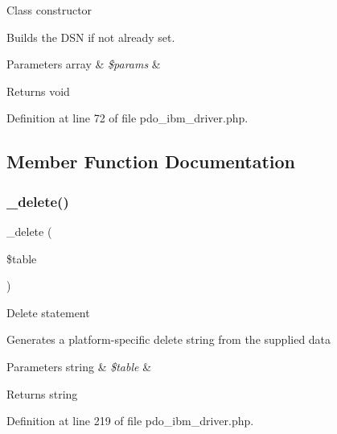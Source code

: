 Class constructor

Builds the D\+SN if not already set.


\begin{DoxyParams}[1]{Parameters}
array & {\em \$params} & \\
\hline
\end{DoxyParams}
\begin{DoxyReturn}{Returns}
void 
\end{DoxyReturn}


Definition at line 72 of file pdo\+\_\+ibm\+\_\+driver.\+php.



\subsection{Member Function Documentation}
\mbox{\label{class_c_i___d_b__pdo__ibm__driver_a133ea8446ded52589bd22cc9163d0896}} 
\subsubsection{\texorpdfstring{\_delete()}{\_delete()}}
{\footnotesize\ttfamily \+\_\+delete (\begin{DoxyParamCaption}\item[{}]{\$table }\end{DoxyParamCaption})\hspace{0.3cm}{\ttfamily [protected]}}

Delete statement

Generates a platform-\/specific delete string from the supplied data


\begin{DoxyParams}[1]{Parameters}
string & {\em \$table} & \\
\hline
\end{DoxyParams}
\begin{DoxyReturn}{Returns}
string 
\end{DoxyReturn}


Definition at line 219 of file pdo\+\_\+ibm\+\_\+driver.\+php.

\mbox{\label{class_c_i___d_b__pdo__ibm__driver_a3a02ea06541b8ecc25a33a61651562c8}} 
